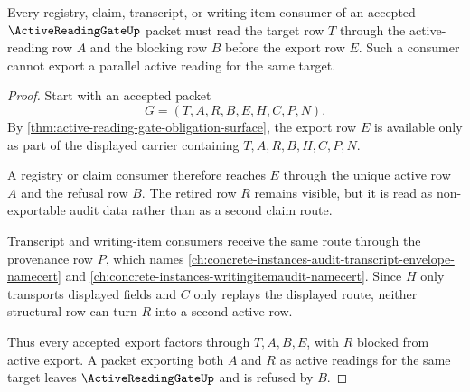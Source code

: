 \begin{theorem}
\label{thm:active-reading-gate-single-export-route}
Every registry, claim, transcript, or writing-item consumer of an accepted $\ActiveReadingGateUp$ packet must read the target row $T$ through the active-reading row $A$ and the blocking row $B$ before the export row $E$. Such a consumer cannot export a parallel active reading for the same target.
\end{theorem}
\begin{proof}
Start with an accepted packet
$$
G=(T,A,R,B,E,H,C,P,N).
$$
By \autoref{thm:active-reading-gate-obligation-surface}, the export row $E$ is available only as part of the displayed carrier containing $T,A,R,B,H,C,P,N$.

A registry or claim consumer therefore reaches $E$ through the unique active row $A$ and the refusal row $B$. The retired row $R$ remains visible, but it is read as non-exportable audit data rather than as a second claim route.

Transcript and writing-item consumers receive the same route through the provenance row $P$, which names \autoref{ch:concrete-instances-audit-transcript-envelope-namecert} and \autoref{ch:concrete-instances-writingitemaudit-namecert}. Since $H$ only transports displayed fields and $C$ only replays the displayed route, neither structural row can turn $R$ into a second active row.

Thus every accepted export factors through $T,A,B,E$, with $R$ blocked from active export. A packet exporting both $A$ and $R$ as active readings for the same target leaves $\ActiveReadingGateUp$ and is refused by $B$.
\end{proof}

